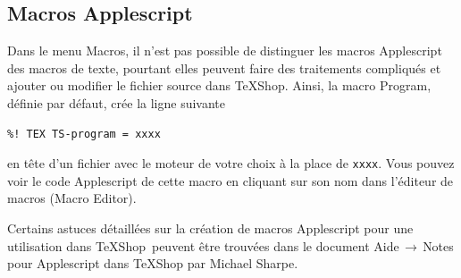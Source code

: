 \documentclass[11pt,french]{article}
\newcommand{\TS}{\textsf{\TeX Shop}}
\newcommand{\cmd}[1]{\textsf{#1}}
\newcommand{\mnu}[1]{\textsf{#1}}
\newcommand{\To}{\,\(\to\)\,}
\newcommand{\selection}{\colorbox{cyan}{\rule[-0.5ex]{0ex}{2.1ex}\texttt{…}}}
\begin{document}
%

\subsection{Macros Applescript} 

Dans le menu \mnu{Macros}, il n'est pas possible de distinguer les macros Applescript des macros de texte, pourtant elles peuvent faire des traitements compliqués et ajouter ou modifier le fichier source dans \TS{}. Ainsi, la macro \mnu{Program}, définie par défaut, crée la ligne suivante
\begin{verbatim}
%! TEX TS-program = xxxx
\end{verbatim}
en tête d'un fichier avec le moteur de votre choix à la place de \texttt{xxxx}. Vous pouvez voir le code Applescript de cette macro en cliquant sur son nom dans l'éditeur de macros (\mnu{Macro Editor}). 

Certains astuces détaillées sur la création de macros Applescript pour une utilisation dans \TS\ peuvent être trouvées dans le document \mnu{Aide}\To\mnu{Notes pour Applescript dans TeXShop} par Michael Sharpe.

\end{document}
